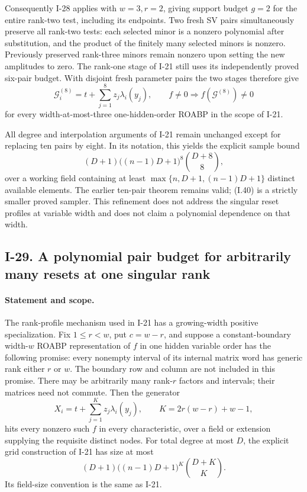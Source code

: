 Consequently I-28 applies with $w=3,r=2$, giving support
budget $g=2$ for the entire rank-two test, including its
endpoints.  Two fresh SV pairs simultaneously preserve all
rank-two tests: each selected minor is a nonzero polynomial
after substitution, and the product of the finitely many
selected minors is nonzero.  Previously preserved rank-three
minors remain nonzero upon setting the new amplitudes to zero.
The rank-one stage of I-21 still uses its independently
proved six-pair budget.  With disjoint fresh parameter pairs
the two stages therefore give
\[
 \mathcal G_i^{(8)}
      =t+\sum_{j=1}^{8}z_j\lambda_i(y_j),
 \qquad f\ne0\Longrightarrow f(\mathcal G^{(8)})\ne0
 \tag{I.40}
\]
for every width-at-most-three one-hidden-order ROABP in the
scope of I-21.

All degree and interpolation arguments of I-21 remain
unchanged except for replacing ten pairs by eight.  In its
notation, this yields the explicit sample bound
\[
 (D+1)\bigl((n-1)D+1\bigr)^8\binom{D+8}{8},
 \tag{I.41}
\]
over a working field containing at least
$\max\{n,D+1,(n-1)D+1\}$ distinct available elements.
The earlier ten-pair theorem remains valid; (I.40) is a
strictly smaller proved sampler.  This refinement does not
address the singular reset profiles at variable width and
does not claim a polynomial dependence on that width.


\subsection{I-29. A polynomial pair budget for arbitrarily many resets at one singular rank}
\label{I-29}

\paragraph{Statement and scope.}
The rank-profile mechanism used in I-21 has a growing-width
positive specialization.  Fix $1\le r<w$, put $c=w-r$, and
suppose a constant-boundary width-$w$ ROABP representation
of $f$ in one hidden variable order has the following promise:
every nonempty interval of its internal matrix word has generic
rank either $r$ or $w$.  The boundary row and column are not
included in this promise.  There may be arbitrarily many
rank-$r$ factors and intervals; their matrices need not commute.
Then the generator
\[
 X_i=t+\sum_{j=1}^{K}z_j\lambda_i(y_j),
 \qquad K=2r(w-r)+w-1,
 \tag{I.42}
\]
hits every nonzero such $f$ in every characteristic, over a
field or extension supplying the requisite distinct nodes.
For total degree at most $D$, the explicit grid construction
of I-21 has size at most
\[
 (D+1)\bigl((n-1)D+1\bigr)^K\binom{D+K}{K}.
 \tag{I.43}
\]
Its field-size convention is the same as I-21.

